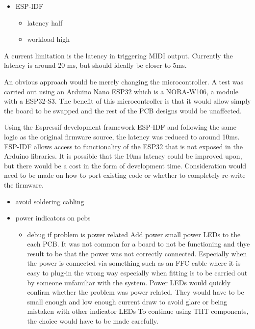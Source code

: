 \begin{itemize}
\item
  ESP-IDF

  \begin{itemize}
  \item
    latency half
  \item
    workload high
  \end{itemize}
\end{itemize}

A current limitation is the latency in triggering MIDI output. Currently
the latency is around 20 ms, but should ideally be closer to 5ms.

An obvious approach would be merely changing the microcontroller. A test
was carried out using an Arduino Nano ESP32 which is a NORA-W106, a
module with a ESP32-S3. The benefit of this microcontroller is that it
would allow simply the board to be swapped and the rest of the PCB
designs would be unaffected.

Using the Espressif development framework ESP-IDF and following the same
logic as the original firmware source, the latency was reduced to around
10ms. ESP-IDF allows access to functionality of the ESP32 that is not
exposed in the Arduino libraries. It is possible that the 10ms latency
could be improved upon, but there would be a cost in the form of
development time. Consideration would need to be made on how to port
existing code or whether to completely re-write the firmware.

\begin{itemize}
\item
  avoid soldering cabling
\item
  power indicators on pcbs

  \begin{itemize}
  \item
    debug if problem is power related Add power small power LEDs to the
    each PCB. It was not common for a board to not be functioning and
    thye result to be that the power was not correctly connected.
    Especially when the power is connected via something such as an FFC
    cable where it is easy to plug-in the wrong way especially when
    fitting is to be carried out by someone unfamiliar with the system.
    Power LEDs would quickly confirm whether the problem was power
    related. They would have to be small enough and low enough current
    draw to avoid glare or being mistaken with other indicator LEDs To
    continue using THT components, the choice would have to be made
    carefully.
  \end{itemize}
\end{itemize}

